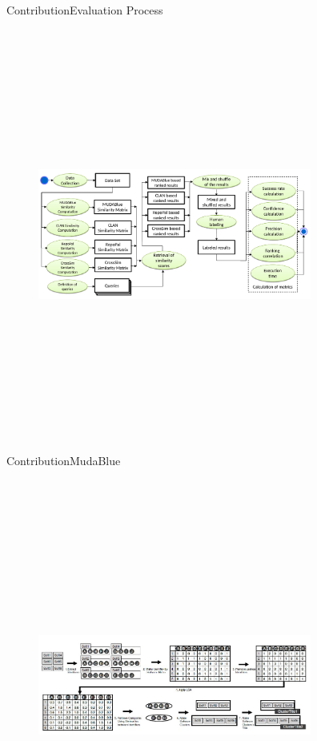 \documentclass{beamer}
\begin{document}
\begin{frame}{Contribution}{Evaluation Process}
	\begin{figure}[!h]
	\includegraphics[width=9cm,height=13.5cm,keepaspectratio]{images/EvaluationProcess.pdf}
	\centering
	\label{fig:EvalProcess}
	\end{figure}
\end{frame}

\begin{frame}{Contribution}{MudaBlue}
	\begin{figure}[!h]
	\includegraphics[width=9cm,height=13.5cm,keepaspectratio]{images/Mudablue1.png}
	\centering
	\label{fig:MudaBlue}
	\end{figure}
\end{frame}
\end{document}
